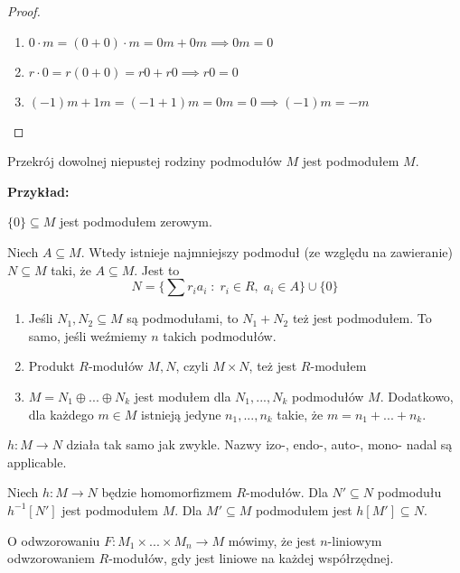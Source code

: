 \begin{proof}$ $\newline
  \begin{enumerate}
    \item $0\cdot m=(0+0)\cdot m=0m+0m\implies 0m=0$
    \item $r\cdot 0=r(0+0)=r0+r0\implies r0=0$
    \item $(-1)m+1m=(-1+1)m=0m=0\implies (-1)m=-m$
  \end{enumerate}
\end{proof}

\begin{remark}
Przekrój dowolnej niepustej rodziny podmodułów $M$ jest podmodułem $M$.
\end{remark}

\setcounter{theorem}{5}

\textbf{Przykład:}

$\{0\}\subseteq M$ jest podmodułem zerowym.

\begin{conclusion}
    Niech $A\subseteq M$. Wtedy istnieje najmniejszy podmoduł (ze względu na zawieranie) $N\subseteq M$ taki, że $A\subseteq M$. Jest to 
    $$N=\{\sum r_ia_i\;:\;r_i\in R,\;a_i\in A\}\cup\{0\}$$
\end{conclusion}

\begin{enumerate}
    \item Jeśli $N_1,N_2\subseteq M$ są podmodułami, to $N_1+N_2$ też jest podmodułem. To samo, jeśli weźmiemy $n$ takich podmodułów.
    \item Produkt $R$-modułów $M,N$, czyli $M\times N$, też jest $R$-modułem
    \item $M=N_1\oplus...\oplus N_k$ jest modułem dla $N_1,...,N_k$ podmodułów $M$. Dodatkowo, dla każdego $m\in M$ istnieją jedyne $n_1,...,n_k$ takie, że $m=n_1+...+n_k$.
\end{enumerate}

 $h:M\to N$ działa tak samo jak zwykle. Nazwy izo-, endo-, auto-, mono- nadal są applicable.

Niech $h:M\to N$ będzie homomorfizmem $R$-modułów. Dla $N'\subseteq N$ podmodułu $h^{-1}[N']$ jest podmodułem $M$. Dla $M'\subseteq M$ podmodułem jest $h[M']\subseteq N$.

O odwzorowaniu $F:M_1\times...\times M_n\to M$ mówimy, że jest $n$-liniowym odwzorowaniem $R$-modułów, gdy jest liniowe na każdej współrzędnej.

